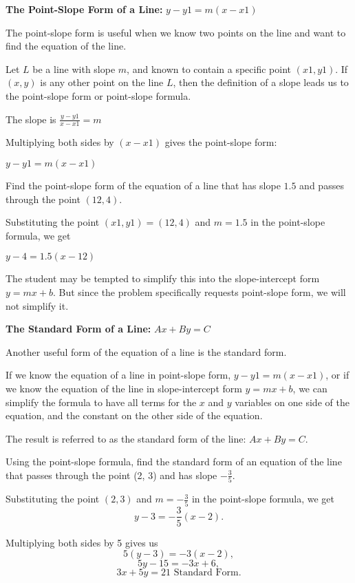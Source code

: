 \textbf{The Point-Slope Form of a Line:} $y - y1 = m(x - x1)$

The point-slope form is useful when we know two points on the line and want to find the equation of the line.

Let $L$ be a line with slope $m$, and known to contain a specific point $(x1, y1)$. If $(x, y)$ is any other point on the line $L$, then the definition of a slope leads us to the point-slope form or point-slope formula.

The slope is $\frac{y - y1}{x - x1} = m$

Multiplying both sides by $(x - x1)$ gives the point-slope form:

$y - y1 = m(x - x1)$

\begin{example}
Find the point-slope form of the equation of a line that has slope $1.5$ and passes through the point $(12,4)$.
\end{example}

\begin{solution}
Substituting the point $(x1, y1) = (12,4)$ and $m= 1.5$ in the point-slope formula, we get

$y - 4 = 1.5(x - 12)$

The student may be tempted to simplify this into the slope-intercept form $y = mx + b$. But since the problem specifically requests point-slope form, we will not simplify it.
\end{solution}

\textbf{The Standard Form of a Line:} $Ax + By = C$

Another useful form of the equation of a line is the standard form.

If we know the equation of a line in point-slope form, $y - y1 = m(x - x1)$, or if we know the equation of the line in slope-intercept form $y = mx + b$, we can simplify the formula to have all terms for the $x$ and $y$ variables on one side of the equation, and the constant on the other side of the equation.

The result is referred to as the standard form of the line: $Ax + By = C$.

\begin{example}
Using the point-slope formula, find the standard form of an equation of the line that passes through the point (2, 3) and has slope $-\frac{3}{5}$.
\end{example}

\begin{solution}
Substituting the point $(2, 3)$ and $m = -\frac{3}{5}$ in the point-slope formula, we get
\[y - 3 = -\frac{3}{5}(x - 2).\]

Multiplying both sides by 5 gives us
\[5(y - 3) = -3(x - 2),\]
\[5y - 15 = -3x + 6,\]
\[3x + 5y = 21 \text{ Standard Form}.\]
\end{solution}


